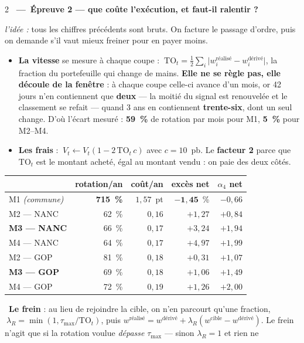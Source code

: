 \documentclass[9pt,a4paper]{extarticle}
\newcommand{\meth}[3]{\vspace{2.2mm}{\color{bleu}\hrule height 0.9pt}\vspace{0.7mm}%
  {\color{bleu}\bfseries #1~---~#2}\par{\footnotesize\color{grisf}\emph{l'idée :} #3}\par\vspace{0.9mm}}
\newcommand{\concret}{\par\vspace{0.9mm}{\color{rouge}\bfseries\footnotesize CONCRÈTEMENT}\par\vspace{0.2mm}}
\newcommand{\obs}[1]{\vspace{0.2mm}\hangindent=3.4mm\hangafter=0{\color{bleu}\footnotesize\textbullet}~{\small #1}\par\vspace{0.2mm}}
\newenvironment{pts}{\begin{itemize}[leftmargin=3.4mm,itemsep=0.2mm,topsep=0.4mm,parsep=0pt,label={\color{bleu}\footnotesize\textbullet}]}{\end{itemize}}
\begin{document}
\begin{multicols}{2}
\meth{\textdollar}{Épreuve 2 --- que coûte l'exécution, et faut-il ralentir ?}{tous les chiffres précédents sont
bruts. On facture le passage d'ordre, puis on demande s'il vaut mieux freiner pour en payer moins.}
\concret
\begin{pts}
\item \textbf{La vitesse} se mesure à chaque coupe :
$\ \mathrm{TO}_t=\tfrac12\sum_i\bigl|w^{\text{réalisé}}_i-w^{\text{dérivé}}_i\bigr|$, la fraction du portefeuille
qui change de mains. \textbf{Elle ne se règle pas, elle découle de la fenêtre} : à chaque coupe celle-ci avance
d'un mois, or 42 jours n'en contiennent que \textbf{deux} --- la moitié du signal est renouvelée et le classement
se refait --- quand 3 ans en contiennent \textbf{trente-six}, dont un seul change. D'où l'écart mesuré :
\textbf{59~\%} de rotation par mois pour M1, \textbf{5~\%} pour M2--M4.
\item \textbf{Les frais} : $\ V_t\leftarrow V_t(1-2\,\mathrm{TO}_t\,c)$ avec $c=10$~pb. Le \textbf{facteur 2}
parce que $\mathrm{TO}_t$ est le montant acheté, égal au montant vendu : on paie des deux côtés.
\end{pts}
\begin{center}\scriptsize
\begin{tabular}{@{}l r r r r@{}}
\toprule
 & rotation/an & coût/an & excès net & $\alpha_4$ net \\
\midrule
M1 \emph{(commune)} & \textbf{715~\%} & $1{,}57$~pt & $\mathbf{-1{,}45}$~\% & $-0{,}66$ \\
M2 --- NANC & 62~\% & $0{,}16$ & $+1{,}27$ & $+0{,}84$ \\
\textbf{M3 --- NANC} & 66~\% & $0{,}17$ & $+3{,}24$ & $+1{,}94$ \\
M4 --- NANC & 64~\% & $0{,}17$ & $+4{,}97$ & $+1{,}99$ \\
M2 --- GOP & 81~\% & $0{,}18$ & $+0{,}31$ & $+1{,}07$ \\
\textbf{M3 --- GOP} & 69~\% & $0{,}18$ & $+1{,}06$ & $+1{,}49$ \\
M4 --- GOP & 72~\% & $0{,}19$ & $+1{,}26$ & $+2{,}00$ \\
\bottomrule
\end{tabular}
\end{center}
\obs{\textbf{Le frein} : au lieu de rejoindre la cible, on n'en parcourt qu'une fraction,
$\ \lambda_R=\min(1,\tau_{\max}/\mathrm{TO}_t)$, puis $w^{\text{réalisé}}=w^{\text{dérivé}}+\lambda_R
(w^{\text{cible}}-w^{\text{dérivé}})$. Le frein n'agit que si la rotation voulue \emph{dépasse} $\tau_{\max}$ --- sinon $\lambda_R=1$ et rien ne
}
\end{multicols}
\end{document}
